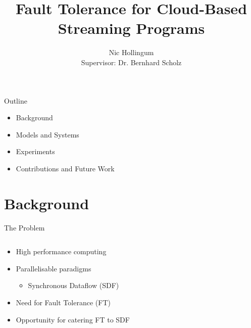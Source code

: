 \documentclass{beamer}
\title[SDF]{Fault Tolerance for Cloud-Based Streaming Programs}
\author{Nic Hollingum \\ Supervisor: Dr. Bernhard Scholz}
\institute{USYD}
\begin{document}
\begin{frame}
\titlepage
\end{frame}

\begin{frame}{Outline}
\begin{itemize}
	\item Background
	\item Models and Systems
	\item Experiments
	\item Contributions and Future Work
\end{itemize}
\end{frame}

\section{Background}

\begin{frame}{The Problem}
\begin{columns}
\begin{column}{6cm}
\begin{itemize}
	\item High performance computing
	\item Parallelisable paradigms
		\begin{itemize}
			\item Synchronous Dataflow (SDF)
		\end{itemize}
	\item Need for Fault Tolerance (FT)
	\item Opportunity for catering FT to SDF
\end{itemize}
\end{column}
\begin{column}{4cm}
\end{column}
\end{columns}
\end{frame}
\end{document}
